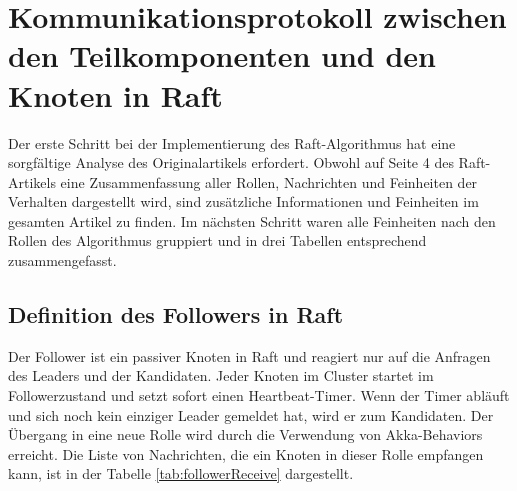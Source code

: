 \section{Kommunikationsprotokoll zwischen den Teilkomponenten und den Knoten in Raft}

Der erste Schritt bei der Implementierung des Raft-Algorithmus hat eine sorgfältige Analyse des Originalartikels erfordert. Obwohl auf Seite 4 des Raft-Artikels eine Zusammenfassung aller Rollen, Nachrichten und Feinheiten der Verhalten dargestellt wird, sind zusätzliche Informationen und Feinheiten im gesamten Artikel zu finden. Im nächsten Schritt waren alle Feinheiten nach den Rollen des Algorithmus gruppiert und in drei Tabellen entsprechend zusammengefasst.

\subsection{Definition des Followers in Raft}

Der Follower ist ein passiver Knoten in Raft und reagiert nur auf die Anfragen des Leaders und der Kandidaten. Jeder Knoten im Cluster startet im Followerzustand und setzt sofort einen Heartbeat-Timer. Wenn der Timer abläuft und sich noch kein einziger Leader gemeldet hat, wird er zum Kandidaten. Der Übergang in eine neue Rolle wird durch die Verwendung von Akka-Behaviors erreicht. Die Liste von Nachrichten, die ein Knoten in dieser Rolle empfangen kann, ist in der Tabelle \ref{tab:followerReceive} dargestellt.

